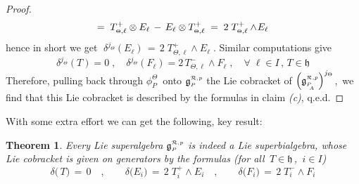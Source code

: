 \documentclass[12pt,reqno,twoside,a4paper]{amsart}
\numberwithin{equation}{section}
\newtheorem{theorem}[lema]{Theorem}
\theoremstyle{definition}
\newtheorem{free text}[lema]{}
\theoremstyle{remark}
\def \Ppicc {{\scriptscriptstyle P}}
\def \Thetapicc {{\scriptscriptstyle \Theta}}
\def \liegRpP{\mathfrak{g}^{\raise1pt\hbox{$ \scriptscriptstyle \mathcal{R},p $}}_\Ppicc}
\def \liegRpPa{\mathfrak{g}^{\raise1pt\hbox{$ \scriptscriptstyle \mathcal{R},p $}}_{\Ppicc_{\raise-3pt\hbox{$ \scriptscriptstyle \!\! A $}}}}
\def \lieh{\mathfrak{h}}
\theoremstyle{plain}
\begin{document}
\begin{proof}
$${   \hfill   = \;  T^+_{\Thetapicc,\ell} \otimes E_\ell \, - \, E_\ell \otimes T^+_{\Thetapicc,\ell}  \; = \; 2 \;
   T^+_{\Thetapicc,\ell} \wedge \! E_\ell  }  $$
%
 hence in short we get  $ \; \delta^{j_\Thetapicc}(E_\ell) \, = \, 2 \; T^+_{\Thetapicc,\ell} \wedge \! E_\ell  \; $.
 Similar computations give
%
  $$
 \delta^{j_\Thetapicc}(T) = 0  \; ,   \!\quad
 \delta^{j_\Thetapicc}(F_\ell) = 2 \, T^-_{\Thetapicc,\ell} \wedge \! F_\ell  \; ,   \quad  \forall \; \ell \in I \, , \, T \!\in \lieh  $$
%
 Therefore, pulling back through  $ \phi_\Ppicc^\Thetapicc \, $  onto  $ \liegRpP $  the Lie cobracket of  $ {\Big( \liegRpPa \Big)}^{j_\Thetapicc} $,  \,we find that this Lie cobracket is described by the formulas in claim  \textit{(c)},  q.e.d.
%
\end{proof}

\vskip11pt

  With some extra effort we can get the following, key result:

\vskip11pt

\begin{theorem}  \label{thm: Lie-sBIalg x liegRP}
%
 Every Lie superalgebra  $ \liegRpP $  is indeed a Lie superbialgebra,
 whose Lie cobracket is given on generators by the formulas
 (for all  $ \, T \in \lieh \, $,  $ \, i \in I $)
%
\begin{equation}  \label{eq: Lie-cobracket x gRP}
%
 \delta\big(\,T\big) \, = \, 0  \quad ,   \qquad  \delta\big(E_i\big) \, =
 \, 2 \; T^+_i \!\wedge E_i  \quad ,   \qquad  \delta\big(F_i\big) \, = \,
 2 \; T^-_i \!\wedge F_i
%
\end{equation}
%
\end{theorem}
\end{document}
